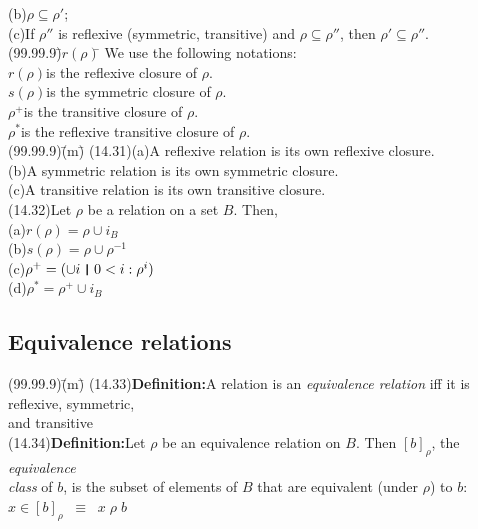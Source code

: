 \documentclass{amsart}
\newcommand{\lgap}{2pt}                             %
\newcommand{\llgap}{6pt}                            %
\newcommand{\equivss}{\ensuremath{\;\;\equiv\;\;}}  %
\newcommand{\thedr}{\rule[-.25ex]{.32mm}{1.75ex}}   %
\newcommand{\dr}{\;\,\thedr\,\;}                    %
\newcommand{\rb}{:}                                 %
\begin{document}
\begin{tabbing}
       \>(b)\>$\rho \subseteq \rho'$;\\[\lgap]
       \>(c)\>If $\rho''$ is reflexive (symmetric, transitive) and $\rho\subseteq\rho''$, then $\rho' \subseteq \rho''$.\\[\llgap]
(99.99.9)\;\=$r(\rho)$\;\=\kill
       \>We use the following notations:\\[\lgap]
       \>$r(\rho)$\>is the reflexive closure of $\rho$.\\[\lgap]
       \>$s(\rho)$\>is the symmetric closure of $\rho$.\\[\lgap]
       \>$\rho^{+}$\>is the transitive closure of $\rho$.\\[\lgap]
       \>$\rho^{*}$\>is the reflexive transitive closure of $\rho$.\\[\llgap]
(99.99.9)\;\=(m)\;\=\kill
(14.31)\>(a)\>A reflexive relation is its own reflexive closure.\\[\lgap]
       \>(b)\>A symmetric relation is its own symmetric closure.\\[\lgap]
       \>(c)\>A transitive relation is its own transitive closure.\\[\llgap]
(14.32)\>Let $\rho$ be a relation on a set $B$. Then,\\[\lgap]
       \>(a)\>$r(\rho) = \rho\cup i_{B}$\\[\lgap]
       \>(b)\>$s(\rho) = \rho\cup \rho^{-1}$\\[\lgap]
       \>(c)\>$\rho^{+} = (\cup i\dr 0<i \rb \rho^{i})$\\[\lgap]
       \>(d)\>$\rho^{*} = \rho^{+} \cup i_{B}$\\[\lgap]
\end{tabbing}

\subsection*{Equivalence relations}
\begin{tabbing}
(99.99.9)\;\=(m)\;\=\kill
(14.33)\>\textbf{Definition:}\quad A relation is an \emph{equivalence relation} iff it is reflexive, symmetric,\\[\lgap]
       \>and transitive\\[\lgap]
(14.34)\>\textbf{Definition:}\quad Let $\rho$ be an equivalence relation on $B$. Then $[b]_{\rho}$, the \emph{equivalence}\\[\lgap]
       \>\emph{class} of $b$, is the subset of elements of $B$ that are equivalent (under $\rho$) to $b$:\\[\lgap]
       \>$x\in [b]_{\rho} \equivss x\;\rho\;b$\\[\lgap]
\end{tabbing}
\end{document}
